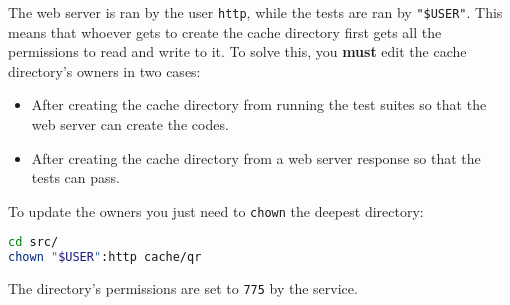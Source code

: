 The web server is ran by the user \texttt{http}, while the tests are ran by \texttt{"\$USER"}.
This means that whoever gets to create the cache directory first gets all the permissions to read and write to it.
To solve this, you \textbf{must} edit the cache directory's owners in two cases:

\begin{itemize}
\item
	After creating the cache directory from running the test suites so that the web server can create the codes.
\item
	After creating the cache directory from a web server response so that the tests can pass.
\end{itemize}

To update the owners you just need to \texttt{chown} the deepest directory:

\begin{lstlisting}[language=sh]
cd src/
chown "$USER":http cache/qr
\end{lstlisting}

The directory's permissions are set to \texttt{775} by the service.
